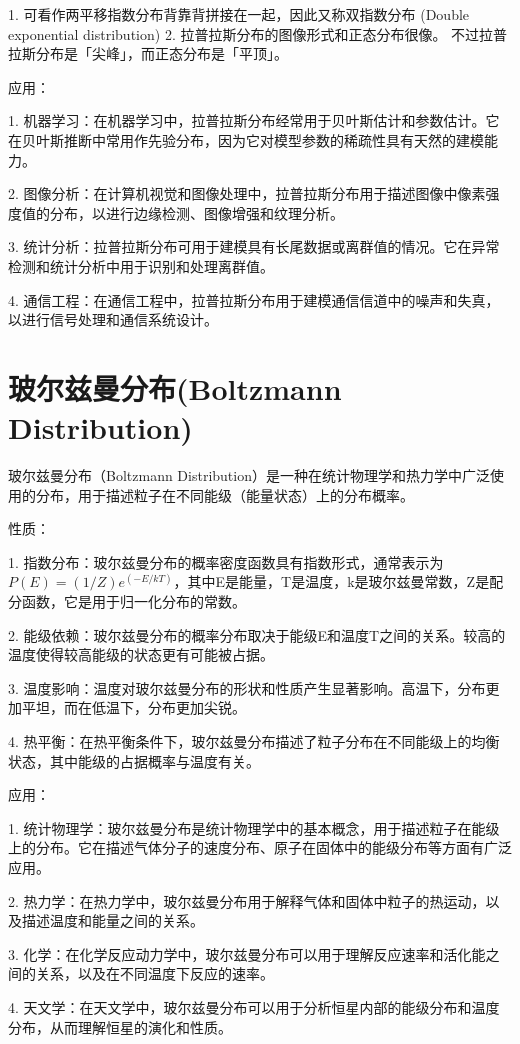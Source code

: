 \documentclass[12pt, a4paper, oneside]{ctexbook}
\begin{document}
1. 可看作两平移指数分布背靠背拼接在一起，因此又称双指数分布 (Double exponential distribution)
2. 拉普拉斯分布的图像形式和正态分布很像。
   不过拉普拉斯分布是「尖峰」，而正态分布是「平顶」。

 应用：

1. 机器学习：在机器学习中，拉普拉斯分布经常用于贝叶斯估计和参数估计。它在贝叶斯推断中常用作先验分布，因为它对模型参数的稀疏性具有天然的建模能力。

2. 图像分析：在计算机视觉和图像处理中，拉普拉斯分布用于描述图像中像素强度值的分布，以进行边缘检测、图像增强和纹理分析。

3. 统计分析：拉普拉斯分布可用于建模具有长尾数据或离群值的情况。它在异常检测和统计分析中用于识别和处理离群值。

4. 通信工程：在通信工程中，拉普拉斯分布用于建模通信信道中的噪声和失真，以进行信号处理和通信系统设计。


\section{玻尔兹曼分布(Boltzmann Distribution)}

玻尔兹曼分布（Boltzmann Distribution）是一种在统计物理学和热力学中广泛使用的分布，用于描述粒子在不同能级（能量状态）上的分布概率。

 性质：

1. 指数分布：玻尔兹曼分布的概率密度函数具有指数形式，通常表示为$P(E) = (1/Z)  e^(-E / kT)$，其中E是能量，T是温度，k是玻尔兹曼常数，Z是配分函数，它是用于归一化分布的常数。

2. 能级依赖：玻尔兹曼分布的概率分布取决于能级E和温度T之间的关系。较高的温度使得较高能级的状态更有可能被占据。

3. 温度影响：温度对玻尔兹曼分布的形状和性质产生显著影响。高温下，分布更加平坦，而在低温下，分布更加尖锐。

4. 热平衡：在热平衡条件下，玻尔兹曼分布描述了粒子分布在不同能级上的均衡状态，其中能级的占据概率与温度有关。

 应用：

1. 统计物理学：玻尔兹曼分布是统计物理学中的基本概念，用于描述粒子在能级上的分布。它在描述气体分子的速度分布、原子在固体中的能级分布等方面有广泛应用。

2. 热力学：在热力学中，玻尔兹曼分布用于解释气体和固体中粒子的热运动，以及描述温度和能量之间的关系。

3. 化学：在化学反应动力学中，玻尔兹曼分布可以用于理解反应速率和活化能之间的关系，以及在不同温度下反应的速率。

4. 天文学：在天文学中，玻尔兹曼分布可以用于分析恒星内部的能级分布和温度分布，从而理解恒星的演化和性质。
\end{document}

